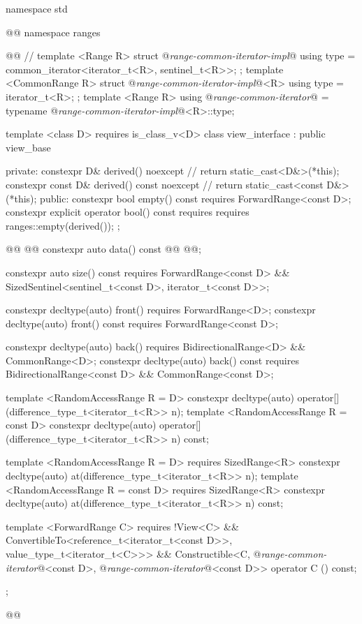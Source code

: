 %
\begin{codeblock}
namespace std { @@ namespace ranges { @@
  // \expos
  template <Range R>
  struct @\textit{range-common-iterator-impl}@ {
    using type = common_iterator<iterator_t<R>, sentinel_t<R>>;
  };
  template <CommonRange R>
  struct @\textit{range-common-iterator-impl}@<R> {
    using type = iterator_t<R>;
  };
  template <Range R>
    using @\textit{range-common-iterator}@ =
      typename @\textit{range-common-iterator-impl}@<R>::type;

  template <class D>
    requires is_class_v<D>
  class view_interface : public view_base {
  private:
    constexpr D& derived() noexcept { // \expos
      return static_cast<D&>(*this);
    }
    constexpr const D& derived() const noexcept { // \expos
      return static_cast<const D&>(*this);
    }
  public:
    constexpr bool empty() const requires ForwardRange<const D>;
    constexpr explicit operator bool() const
      requires requires { ranges::empty(derived()); };

    @@
        @@
    constexpr auto data() const @@
      @@;

    constexpr auto size() const requires ForwardRange<const D> &&
      SizedSentinel<sentinel_t<const D>, iterator_t<const D>>;

    constexpr decltype(auto) front() requires ForwardRange<D>;
    constexpr decltype(auto) front() const requires ForwardRange<const D>;

    constexpr decltype(auto) back()
      requires BidirectionalRange<D> && CommonRange<D>;
    constexpr decltype(auto) back() const
      requires BidirectionalRange<const D> && CommonRange<const D>;

    template <RandomAccessRange R = D>
      constexpr decltype(auto) operator[](difference_type_t<iterator_t<R>> n);
    template <RandomAccessRange R = const D>
      constexpr decltype(auto) operator[](difference_type_t<iterator_t<R>> n) const;

    template <RandomAccessRange R = D>
        requires SizedRange<R>
      constexpr decltype(auto) at(difference_type_t<iterator_t<R>> n);
    template <RandomAccessRange R = const D>
        requires SizedRange<R>
      constexpr decltype(auto) at(difference_type_t<iterator_t<R>> n) const;

    template <ForwardRange C>
        requires !View<C> &&
          ConvertibleTo<reference_t<iterator_t<const D>>, value_type_t<iterator_t<C>>> &&
          Constructible<C, @\textit{range-common-iterator}@<const D>, @\textit{range-common-iterator}@<const D>>
      operator C () const;
  };
}}@\removed{\}\}}@
\end{codeblock}

